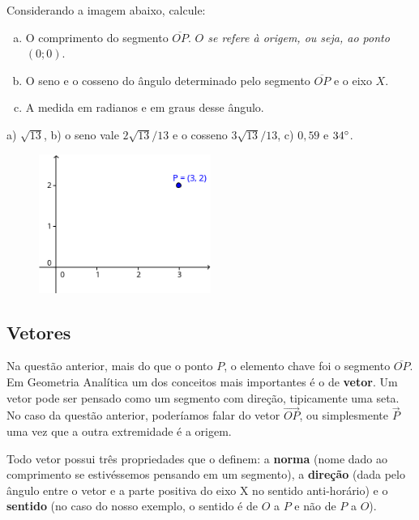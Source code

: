 \documentclass[main.tex]{subfiles}
\begin{document}
\begin{questao}
Considerando a imagem abaixo, calcule:
\begin{enumerate}[a)]
\item O comprimento do segmento $\overline{OP}$. \textit{$O$ se refere à origem, ou seja, ao ponto $(0;0)$}.
\item O seno e o cosseno do ângulo determinado pelo segmento $\overline{OP}$ e o eixo $X$. 
\item A medida em radianos e em graus desse ângulo.
\end{enumerate}
\end{questao}

\begin{gabarito}
	\begin{gabaritoQuestao}
		a) $\sqrt{13}$, b) o seno vale $2\sqrt{13}/13$ e o cosseno $3\sqrt{13}/13$, c) $0,59$ e $34\degree$.
	\end{gabaritoQuestao}
\end{gabarito}

\begin{figure}[h]
\centering
\includegraphics[width=0.5\textwidth]{./img/c4q5.png}
\end{figure}

\subsection*{Vetores}

Na questão anterior, mais do que o ponto $P$, o elemento chave foi o segmento $\overline{OP}$. Em Geometria Analítica um dos conceitos mais importantes é o de \textbf{vetor}. Um vetor pode ser pensado como um segmento com direção, tipicamente uma seta. No caso da questão anterior, poderíamos falar do vetor $\overrightarrow{OP}$, ou simplesmente $\overrightarrow{P}$ uma vez que a outra extremidade é a origem.

Todo vetor possui três propriedades que o definem: a \textbf{norma} (nome dado ao comprimento se estivéssemos pensando em um segmento), a \textbf{direção} (dada pelo ângulo entre o vetor e a parte positiva do eixo X no sentido anti-horário) e o \textbf{sentido} (no caso do nosso exemplo, o sentido é de $O$ a $P$ e não de $P$ a $O$).
\end{document}
